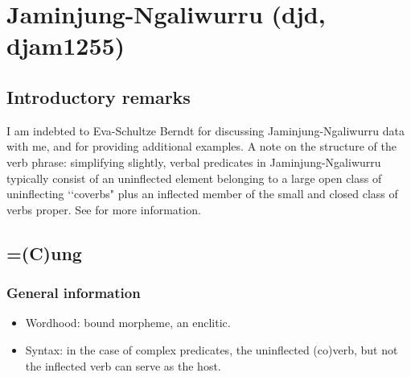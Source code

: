 \section{Jaminjung-Ngaliwurru (djd, djam1255)}
\label{appendixJaminjung}

\subsection{Introductory remarks}
I am indebted to Eva-Schultze Berndt for discussing Jaminjung-Ngaliwurru data with me, and for providing additional examples. A note on the structure of the verb phrase: simplifying slightly, verbal predicates in  Jaminjung-Ngaliwurru typically consist of an uninflected element belonging to a large open class of uninflecting \lq\lq coverbs" plus an inflected member of the small and closed class of verbs proper. See \textcite[ch. 3]{SchultzeBerndt2000} for more information.

\subsection{=(C)ung}

\subsubsection{General information}
\begin{itemize}
	\item Wordhood: bound morpheme, an enclitic.
	\item Syntax: in the case of complex predicates, the uninflected (co)verb, but not the inflected verb can serve as the host.
 \end{itemize}

